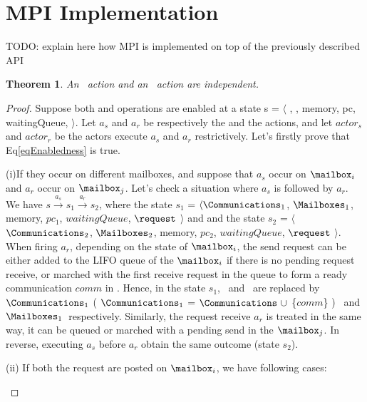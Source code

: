 \documentclass[a4paper,11pt]{article}
\theoremstyle{break}
\newtheorem{theorem}{Theorem}[section]
\begin{document}
 
\section{MPI Implementation}\label{sec:mpi}

TODO: explain here how MPI is implemented on top of the previously described API
\newpage
\nocite{*}	  	



\newpage
\begin{appendices}

	\begin{theorem}
		An \asynsend~action and an \asynreceive~action are independent.
	\end{theorem}

\begin{proof}
 Suppose both \asynsend and \asynreceive operations are enabled at a state s = $\langle$ \Communications, \Mailboxes, memory, pc, waitingQueue, \request $\rangle$. Let $a_s$ and $a_r$ be respectively the \asynsend and the \asynreceive actions, and let $actor_s$ and $actor_r$ be the actors execute $a_s$ and $a_r$ restrictively. Let's firstly prove that Eq\ref{eqEnabledness} is true.
 
 (i)If they occur on different mailboxes, and suppose that $a_s$ occur on $\mailbox_i$  and $a_r$ occur on $\mailbox_j$. Let's check a situation where $a_s$ is followed by $a_r$. We have $s\xrightarrow{a_s}s_1\xrightarrow{a_r}s_2$, where the state $s_1$ = $\langle \Communications_1$, $\Mailboxes_1$, memory, $pc_1$, $waitingQueue$, $\request$ $\rangle$ and and the state $s_2$ = $\langle$$\Communications_2$, $\Mailboxes_2$, memory, $pc_2$, $waitingQueue$, $\request$ $\rangle$. When firing $a_r$, depending on the state of $\mailbox_i$, the send request can be either added to the LIFO queue of the $\mailbox_i$ if there is no pending request receive, or marched with the first receive request in the queue to form a ready communication $comm$ in \Communications. Hence, in the state $s_1$, \Communications~and \Mailboxes~are replaced by  $\Communications_1$ ( $\Communications_1$ = $\Communications~ \cup$ \{$comm$\} ) ~and $\Mailboxes_1$~respectively. Similarly, the request receive $a_r$ is treated in the same way, it can be queued or marched with a pending send in the $\mailbox_j$. In reverse, executing $a_s$ before $a_r$ obtain the same outcome (state $s_2$).
 
 (ii) If both the request are posted on $\mailbox_i$, we have following cases:
\begin{itemize}
	

\end{itemize}
\end{proof}
\end{appendices}
\end{document}
